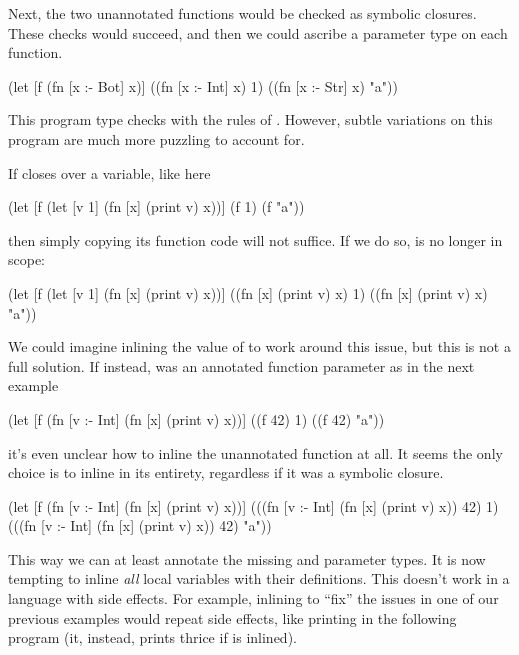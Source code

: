 Next, the two unannotated functions would be checked as symbolic closures.
These checks would succeed, and then we could ascribe a parameter type on
each function.

\begin{cljlisting}
(let [f (fn [x :- Bot] x)]
  ((fn [x :- Int] x) 1)
  ((fn [x :- Str] x) "a"))
\end{cljlisting}

This program type checks with the rules of \ltiFsub.
However, subtle variations on this program are much
more puzzling to account for.

If  closes over a variable, like 
here

\begin{cljlisting}
(let [f (let [v 1] (fn [x] (print v) x))]
  (f 1)
  (f "a"))
\end{cljlisting}

then simply copying its function code will
not suffice.
If we do so,  is no longer in scope:

\begin{cljlisting}
(let [f (let [v 1] (fn [x] (print v) x))]
  ((fn [x] (print v) x) 1)
  ((fn [x] (print v) x) "a"))
\end{cljlisting}

We could imagine inlining the value of 
 to work around this issue, but this is not a
full solution.
If instead,  was an annotated function parameter
as in the next example

\begin{cljlisting}
(let [f (fn [v :- Int]
          (fn [x] (print v) x))]
  ((f 42) 1)
  ((f 42) "a"))
\end{cljlisting}

it's even unclear how to inline the
unannotated function at all.
It seems the only choice is to inline 
in its entirety, regardless if it was a symbolic closure.

\begin{cljlisting}
(let [f (fn [v :- Int]
          (fn [x] (print v) x))]
  (((fn [v :- Int]
      (fn [x] (print v) x))
    42)
   1)
  (((fn [v :- Int]
      (fn [x] (print v) x))
    42)
   "a"))
\end{cljlisting}

This way we can at least annotate the missing  and 
parameter types.
It is now tempting to inline \emph{all} local variables with their
definitions.
This doesn't work in a language with side effects.
For example, inlining  to ``fix'' the issues
in one of our previous examples would repeat side
effects, like printing  in the following
program (it, instead, prints thrice if  is inlined).

